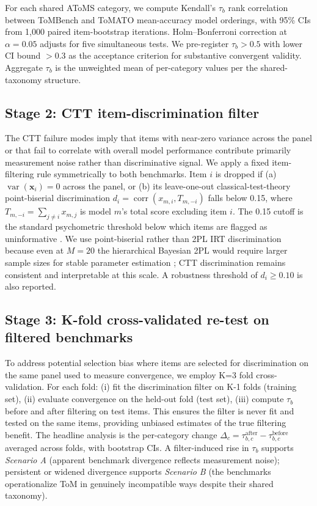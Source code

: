 \documentclass{article} %
\begin{document}
For each shared AToMS category, we compute Kendall's $\tau_b$ rank correlation between ToMBench and ToMATO mean-accuracy model orderings, with 95\% CIs from 1{,}000 paired item-bootstrap iterations. Holm--Bonferroni correction at $\alpha=0.05$ adjusts for five simultaneous tests. We pre-register $\tau_b > 0.5$ with lower CI bound $> 0.3$ as the acceptance criterion for substantive convergent validity. Aggregate $\tau_b$ is the unweighted mean of per-category values per the shared-taxonomy structure.

\subsection{Stage 2: CTT item-discrimination filter}
\label{sec:methods-stage2}

The CTT failure modes imply that items with near-zero variance across the panel or that fail to correlate with overall model performance contribute primarily measurement noise rather than discriminative signal. We apply a fixed item-filtering rule symmetrically to both benchmarks. Item $i$ is dropped if (a) $\operatorname{var}(\mathbf{x}_i)=0$ across the panel, or (b) its leave-one-out classical-test-theory point-biserial discrimination $d_i = \operatorname{corr}(x_{m,i},T_{m,-i})$ falls below 0.15, where $T_{m,-i}=\sum_{j\neq i}x_{m,j}$ is model $m$'s total score excluding item $i$. The 0.15 cutoff is the standard psychometric threshold below which items are flagged as uninformative \citep{furr2014psychometrics,edelen2007applying}. We use point-biserial rather than 2PL IRT discrimination because even at $M=20$ the hierarchical Bayesian 2PL would require larger sample sizes for stable parameter estimation \citep{konig2020optimized,fujimoto2020bayesian}; CTT discrimination remains consistent and interpretable at this scale. A robustness threshold of $d_i\ge 0.10$ is also reported.

\subsection{Stage 3: K-fold cross-validated re-test on filtered benchmarks}
\label{sec:methods-stage3}

To address potential selection bias where items are selected for discrimination on the same panel used to measure convergence, we employ K=3 fold cross-validation. For each fold: (i) fit the discrimination filter on K-1 folds (training set), (ii) evaluate convergence on the held-out fold (test set), (iii) compute $\tau_b$ before and after filtering on test items. This ensures the filter is never fit and tested on the same items, providing unbiased estimates of the true filtering benefit. The headline analysis is the per-category change $\Delta_c = \tau_{b,c}^{\text{after}} - \tau_{b,c}^{\text{before}}$ averaged across folds, with bootstrap CIs. A filter-induced rise in $\tau_b$ supports \emph{Scenario A} (apparent benchmark divergence reflects measurement noise); persistent or widened divergence supports \emph{Scenario B} (the benchmarks operationalize ToM in genuinely incompatible ways despite their shared taxonomy).
\end{document}

